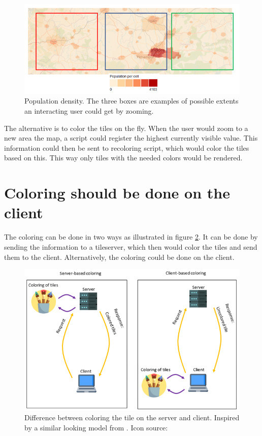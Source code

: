 \begin{figure} [H]
	\centering
	\includegraphics[width=.8\textwidth]{Pictures/WhyNotPrecolor}
	\caption{Population density. The three boxes are examples of possible extents an interacting user could get by zooming.}
	\label{WhyNotPrecolor}
\end{figure}

The alternative is to color the tiles on the fly. When the user would zoom to a new area the map, a script could register the highest currently visible value. This information could then be sent to recoloring script, which would color the tiles based on this. This way only tiles with the needed colors would be rendered. 


\section{Coloring should be done on the client}
The coloring can be done in two ways as illustrated in figure \ref{WhyColorLocally}. It can be done by sending the information to a tileserver, which then would color the tiles and send them to the client. Alternatively, the coloring could be done on the client. 

\begin{figure} [H]
	\centering
	\includegraphics[width=.8\textwidth]{Pictures/WhyColorLocally}
	\caption{Difference between coloring the tile on the server and client. Inspired by a similar looking model from \citet{Baumrocks}. Icon source: \citep{Freepik}}
	\label{WhyColorLocally}
\end{figure}

